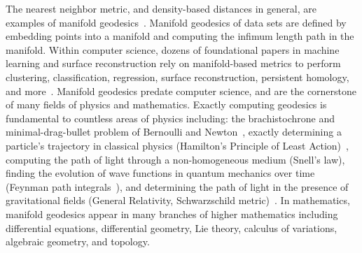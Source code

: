 The nearest neighbor metric, and density-based distances in general, are
examples of manifold geodesics~\cite{sajama05estimatingDBDM,
tenenbaum00global}.  Manifold geodesics of data sets are
defined by embedding points into a manifold and computing the infimum
length path in the manifold.  Within computer science, dozens of
foundational papers in machine learning and surface reconstruction rely on
manifold-based metrics to perform clustering, classification, regression,
surface reconstruction, persistent homology, and
more~\cite{tenenbaum00global, cohen15approximating, vincent03,
bijral11semiSupLearningDBD,  sajama05estimatingDBDM,
edelsbrunner02topological, alamgir12shortest, vL09}.  Manifold geodesics
predate computer science, and are the cornerstone of many fields of physics
and mathematics.  Exactly computing geodesics is fundamental to countless
areas of physics including: the brachistochrone and minimal-drag-bullet
problem of Bernoulli and Newton~\cite{bernoulli}, exactly determining a particle's
trajectory in classical physics (Hamilton's Principle of Least
Action)~\cite{Courant53}, computing the path of light through a
non-homogeneous medium (Snell's law), finding the evolution of wave
functions in quantum mechanics over time (Feynman path integrals~\cite{Feynman48}), and
determining the path of light in the presence of gravitational fields
(General Relativity, Schwarzschild metric)~\cite{Schwarzschild, Sussmann97}. In
mathematics, manifold geodesics appear in many branches of higher
mathematics including differential equations, differential geometry, Lie
theory, calculus of variations, algebraic geometry, and topology.

